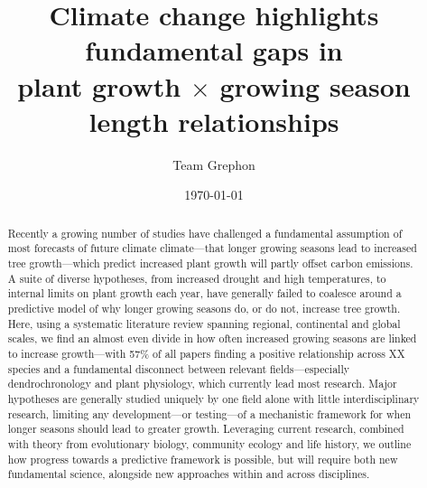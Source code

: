 \documentclass[11pt]{article}
\begin{document}
\renewcommand{\refname}{\CHead{}}


\title{Climate change highlights fundamental gaps in\\ plant growth $\times$ growing season length relationships} %
\author{Team Grephon}
\date{\today}
\maketitle



\begin{abstract} %
Recently a growing number of studies have challenged a fundamental assumption of most forecasts of future climate climate---that longer growing seasons lead to increased tree growth---which predict increased plant growth will partly offset carbon emissions. A suite of diverse hypotheses, from increased drought and high temperatures, to internal limits on plant growth each year, have generally failed to coalesce around a predictive model of why longer growing seasons do, or do not, increase tree growth. Here, using a systematic literature review spanning regional, continental and global scales, we find an almost even divide in how often increased growing seasons are linked to increase growth---with 57\% of all papers finding a positive relationship across XX species and a fundamental disconnect between relevant fields---especially dendrochronology and plant physiology, which currently lead most research. Major hypotheses are generally studied uniquely by one field alone with little interdisciplinary research, limiting any development---or testing---of a mechanistic framework for when longer seasons should lead to greater growth. Leveraging current research, combined with theory from evolutionary biology, community ecology and life history, we outline how progress towards a predictive framework is possible, but will require both new fundamental science, alongside new approaches within and across disciplines.  
\end{abstract}
\end{document}

